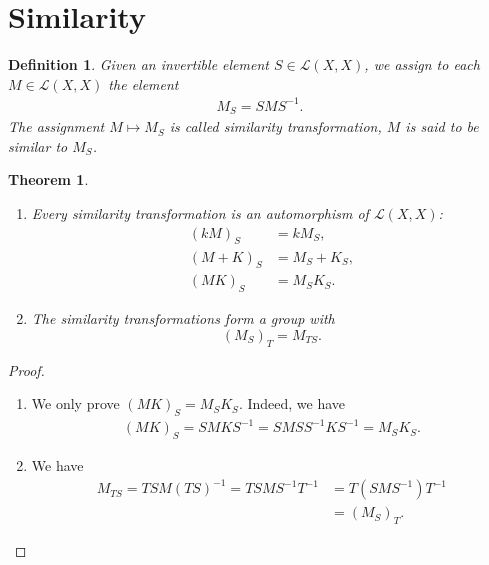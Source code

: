 \documentclass[10pt]{book}
\newtheorem{definition}{Definition}[chapter]
\newtheorem{theorem}{Theorem}[chapter]
\theoremstyle{definition}
\numberwithin{equation}{chapter}
\begin{document}
\medskip

\section{Similarity}
\begin{definition}\label{similarity}
Given an invertible element $S\in \mathscr{L}(X, X)$, we assign to each $M\in \mathscr{L}(X,X)$ the element
\begin{align*}
    M_S = SMS^{-1}.
\end{align*}
The assignment $M\mapsto M_S$ is called similarity transformation, $M$ is said to be similar to $M_S$.
\end{definition}

\medskip

\begin{theorem}
~\begin{enumerate}[label=(\alph*)]
    \item Every similarity transformation is an automorphism of $\mathscr{L}(X,X)$:
    \begin{align*}
        (kM)_S & = kM_S,\\
        (M+K)_S & = M_S + K_S,\\
        (MK)_S & = M_S K_S.
    \end{align*}
    \item The similarity transformations form a group with $$(M_S)_T = M_{TS}.$$
\end{enumerate}
\end{theorem}
\begin{proof}
~\begin{enumerate}[label=(\alph*)]
    \item We only prove $(MK)_S = M_S K_S$. Indeed, we have 
    \begin{align*}
        (MK)_S = S M K S^{-1} = S M S S^{-1} K S^{-1} = M_S K_S.
    \end{align*}
    \item We have 
    \begin{align*}
        M_{TS} = TS M (TS)^{-1} = TS M S^{-1} T^{-1} & = T(S M S^{-1}) T^{-1} \\
        & = (M_S)_T.
    \end{align*}
\end{enumerate}
\end{proof}

\medskip
\end{document}

